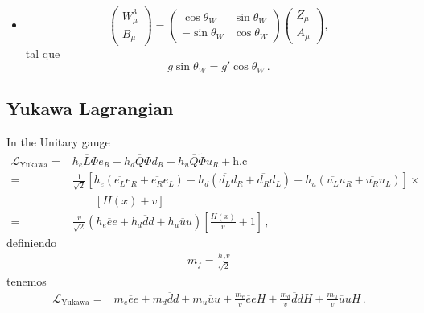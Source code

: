 \begin{frame}
\begin{itemize}
\item 
\begin{equation}
\label{eq:azmix}
  \begin{pmatrix}
    W^3_\mu\\
    B_\mu
  \end{pmatrix}=\begin{pmatrix}
    \cos\theta_W & \sin\theta_W\\
    -\sin\theta_W& \cos\theta_W
  \end{pmatrix}
  \begin{pmatrix}
    Z_\mu\\
    A_\mu
  \end{pmatrix},
\end{equation}
tal que
\begin{equation}
  \label{eq:tw}
  g\sin\theta_W=g'\cos\theta_W\,.
\end{equation}
\end{itemize} %

\end{frame}
\subsection{Yukawa Lagrangian}

\begin{frame}
In the Unitary gauge
\begin{align}
  \mathcal{L}_{\text{Yukawa}}=&h_e\overline{L}\Phi e_R+h_d\overline{Q}\Phi d_R+h_u\overline{Q}\widetilde{\Phi}u_R+\text{h.c}\nonumber\\
=&\frac{1}{\sqrt{2}}\left[h_e(\overline{e_L}e_R+\overline{e_R}e_L)+
h_d(\overline{d_L}d_R+\overline{d_R}d_L)
+h_u(\overline{u_L}u_R+\overline{u_R}u_L)\right]\times\nonumber\\
&\qquad\left[H(x)+v\right]\nonumber\\
=&\frac{v}{\sqrt{2}}\left(h_e\overline{e}e+h_d\overline{d}d
+h_u\overline{u}u\right)
\left[\frac{H(x)}{v}+1\right]\,,
\end{align}
definiendo
\begin{align}
  m_f=\frac{h_fv}{\sqrt{2}}
\end{align}
tenemos
\begin{align}
\label{eq:lyukfin}
 \mathcal{L}_{\text{Yukawa}}=&m_e\overline{e}e+m_d\overline{d}d
+m_u\overline{u}u+
  \frac{m_e}{v}\overline{e}e H+\frac{m_d}{v}\overline{d}d H
+\frac{m_u}{v}\overline{u}u H\,.
\end{align}

\end{frame}
